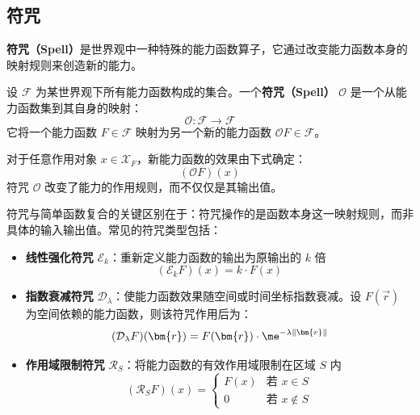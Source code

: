 \subsection{符咒}\label{subsec:spell}
\textbf{符咒（Spell）}是世界观中一种特殊的能力函数算子，它通过改变能力函数本身的映射规则来创造新的能力。

\begin{definition}[符咒]
    设 $\mathscr{F}$ 为某世界观下所有能力函数构成的集合。一个\textbf{符咒（Spell）} $\mathcal{O}$ 是一个从能力函数集到其自身的映射：
    \begin{equation}
        \mathcal{O}: \mathscr{F} \to \mathscr{F}
    \end{equation}
    它将一个能力函数 $F \in \mathscr{F}$ 映射为另一个新的能力函数 $\mathcal{O}F \in \mathscr{F}$。

    对于任意作用对象 $x \in \mathcal{X}_F$，新能力函数的效果由下式确定：
    \begin{equation}
        (\mathcal{O}F)(x)
    \end{equation}
    符咒 $\mathcal{O}$ 改变了能力的作用规则，而不仅仅是其输出值。
\end{definition}

符咒与简单函数复合的关键区别在于：符咒操作的是函数本身这一映射规则，而非具体的输入输出值。常见的符咒类型包括：

\begin{itemize}
    \item \textbf{线性强化符咒} $\mathcal{E}_k$：重新定义能力函数的输出为原输出的 $k$ 倍
          \begin{equation}
              (\mathcal{E}_k F)(x) = k \cdot F(x)
          \end{equation}

    \item \textbf{指数衰减符咒} $\mathcal{D}_{\lambda}$：使能力函数效果随空间或时间坐标指数衰减。设 $F(\vec{r})$ 为空间依赖的能力函数，则该符咒作用后为：
          \begin{equation}
              (\mathcal{D}_{\lambda} F)(\bm{r}) = F(\bm{r}) \cdot \me^{-\lambda \|\bm{r}\|}
          \end{equation}

    \item \textbf{作用域限制符咒} $\mathcal{R}_S$：将能力函数的有效作用域限制在区域 $S$ 内
          \begin{equation}
              (\mathcal{R}_S F)(x) = \begin{cases}
                  F(x) & \text{若 } x \in S    \\
                  0    & \text{若 } x \notin S
              \end{cases}
          \end{equation}

\end{itemize}


